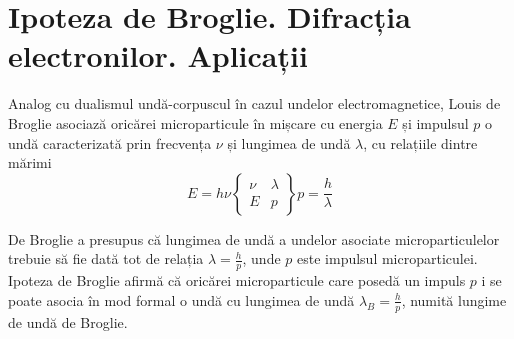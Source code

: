 \section{Ipoteza de Broglie. Difracția electronilor. Aplicații}

Analog cu dualismul undă-corpuscul în cazul undelor electromagnetice, Louis de Broglie asociază oricărei microparticule în mișcare cu energia $E$ și impulsul $p$ o undă caracterizată prin frecvența $\nu$ și lungimea de undă $\lambda$, cu relațiile dintre mărimi
\[
    E = h \nu
    \begin{Bmatrix}
        \nu & \lambda \\
        E   & p
    \end{Bmatrix}
    p = \frac{h}{\lambda}
\]

De Broglie a presupus că lungimea de undă a undelor asociate microparticulelor
trebuie să fie dată tot de relația \( \lambda = \frac{h}{p} \), unde $p$ este
impulsul microparticulei.
Ipoteza de Broglie afirmă că oricărei microparticule care posedă un impuls $p$
i se poate asocia în mod formal o undă cu lungimea de undă
\( \lambda_B = \frac{h}{p} \), numită lungime de undă de Broglie.
